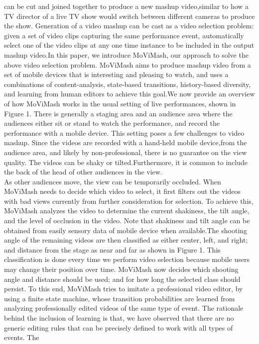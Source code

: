 \documentclass{sig-alternate}
\begin{document}
can be cut and joined together to produce a new mashup video,similar to how a TV director of a live TV show would switch between different cameras to produce the show. Generation of a video
mashup can be cast as a video selection problem: given a set of video clips capturing the same performance event, automatically select one of the video clips at any one time instance to be included in the output mashup video.In this paper, we introduce MoViMash, our approach to solve the above video selection problem. MoViMash aims to produce mashup video from a set of mobile devices that is interesting and pleasing to watch, and uses a combinations of content-analysis, state-based transitions, history-based diversity, and learning from
human editors to achieve this goal.We now provide an overview of how MoViMash works in the
usual setting of live performances, shown in Figure 1. There is generally a staging area and an audience area where the audiences either sit or stand to watch the performance, and record the performance with a mobile device. This setting poses a few challenges to video mashup.
Since the videos are recorded with a hand-held mobile device,from the audience area, and likely by non-professional, there is no guarantee on the view quality. The videos can be shaky or tilted.Furthermore, it is common to include the back of the head of other
audiences in the view.\\
\qquad As other audiences move, the view can be temporarily occluded. When MoViMash needs to decide which video to select, it first filters out the videos with bad views currently from further consideration for selection. To achieve this, MoViMash analyzes the video to determine the current shakiness, the tilt angle, and the level of occlusion in the video. Note that shakiness and tilt angle can be obtained from easily sensory data of mobile
device when available.The shooting angle of the remaining videos are then classified as
either center, left, and right; and distance from the stage as near and far as shown in Figure 1. This classification is done every time we perform video selection because mobile users may change their position over time. MoViMash now decides which shooting angle and distance should be used; and for how long the selected class should persist. To this end, MoViMash tries to imitate a professional video editor, by using a finite state machine, whose transition probabilities are learned from analyzing professionally edited videos of the same type of event. The rationale behind the inclusion of learning is that, we have observed that there are no generic editing rules that can be precisely defined to work with all types of events. The
\end{document}
